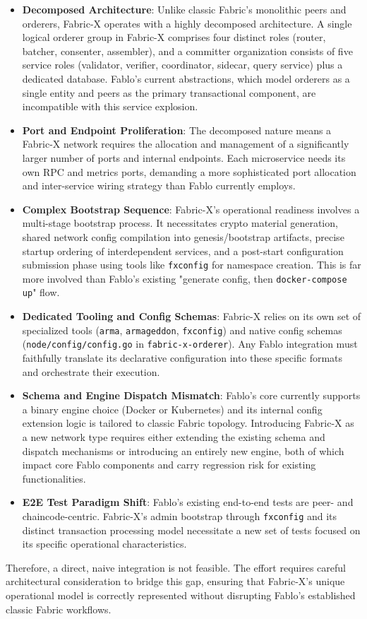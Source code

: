 \begin{itemize}[leftmargin=*]
    \item \textbf{Decomposed Architecture}: Unlike classic Fabric's monolithic peers and orderers, Fabric-X operates with a highly decomposed architecture. A single logical orderer group in Fabric-X comprises four distinct roles (router, batcher, consenter, assembler), and a committer organization consists of five service roles (validator, verifier, coordinator, sidecar, query service) plus a dedicated database. Fablo's current abstractions, which model orderers as a single entity and peers as the primary transactional component, are incompatible with this service explosion.
    \item \textbf{Port and Endpoint Proliferation}: The decomposed nature means a Fabric-X network requires the allocation and management of a significantly larger number of ports and internal endpoints. Each microservice needs its own RPC and metrics ports, demanding a more sophisticated port allocation and inter-service wiring strategy than Fablo currently employs.
    \item \textbf{Complex Bootstrap Sequence}: Fabric-X's operational readiness involves a multi-stage bootstrap process. It necessitates crypto material generation, shared network config compilation into genesis/bootstrap artifacts, precise startup ordering of interdependent services, and a post-start configuration submission phase using tools like \texttt{fxconfig} for namespace creation. This is far more involved than Fablo's existing "generate config, then \texttt{docker-compose up}" flow.
    \item \textbf{Dedicated Tooling and Config Schemas}: Fabric-X relies on its own set of specialized tools (\texttt{arma}, \texttt{armageddon}, \texttt{fxconfig}) and native config schemas (\texttt{node/config/config.go} in \texttt{fabric-x-orderer}). Any Fablo integration must faithfully translate its declarative configuration into these specific formats and orchestrate their execution.
    \item \textbf{Schema and Engine Dispatch Mismatch}: Fablo's core currently supports a binary engine choice (Docker or Kubernetes) and its internal config extension logic is tailored to classic Fabric topology. Introducing Fabric-X as a new network type requires either extending the existing schema and dispatch mechanisms or introducing an entirely new engine, both of which impact core Fablo components and carry regression risk for existing functionalities.
    \item \textbf{E2E Test Paradigm Shift}: Fablo's existing end-to-end tests are peer- and chaincode-centric. Fabric-X's admin bootstrap through \texttt{fxconfig} and its distinct transaction processing model necessitate a new set of tests focused on its specific operational characteristics.
\end{itemize}
Therefore, a direct, naive integration is not feasible. The effort requires careful architectural consideration to bridge this gap, ensuring that Fabric-X's unique operational model is correctly represented without disrupting Fablo's established classic Fabric workflows.
 
